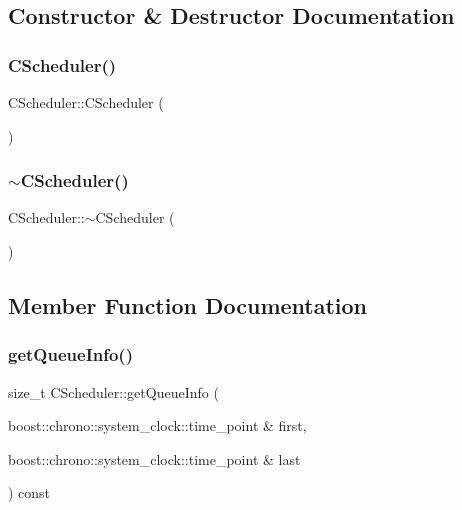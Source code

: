 \subsection{Constructor \& Destructor Documentation}
\mbox{\label{class_c_scheduler_a388ba8ffa4dfc6ed0a4ac63ddeb2a51a}} 
\subsubsection{\texorpdfstring{C\+Scheduler()}{CScheduler()}}
{\footnotesize\ttfamily C\+Scheduler\+::\+C\+Scheduler (\begin{DoxyParamCaption}{ }\end{DoxyParamCaption})}

\mbox{\label{class_c_scheduler_ab453c8d28d84cf31ee3d5f621f4f45ed}} 
\subsubsection{\texorpdfstring{$\sim$\+C\+Scheduler()}{~CScheduler()}}
{\footnotesize\ttfamily C\+Scheduler\+::$\sim$\+C\+Scheduler (\begin{DoxyParamCaption}{ }\end{DoxyParamCaption})}



\subsection{Member Function Documentation}
\mbox{\label{class_c_scheduler_a6cdbfd095e9f7695c09769d4c1b05461}} 
\subsubsection{\texorpdfstring{get\+Queue\+Info()}{getQueueInfo()}}
{\footnotesize\ttfamily size\+\_\+t C\+Scheduler\+::get\+Queue\+Info (\begin{DoxyParamCaption}\item[{boost\+::chrono\+::system\+\_\+clock\+::time\+\_\+point \&}]{first,  }\item[{boost\+::chrono\+::system\+\_\+clock\+::time\+\_\+point \&}]{last }\end{DoxyParamCaption}) const}

